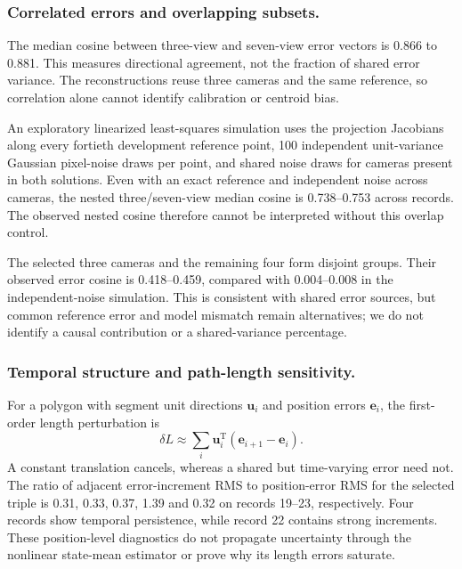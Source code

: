 \documentclass{iopjournal}
\begin{document}
\subsubsection{Correlated errors and overlapping subsets.}
The median cosine between three-view and seven-view error vectors is 0.866
to 0.881. This measures directional agreement, not the fraction of shared
error variance. The reconstructions reuse three cameras and the same
reference, so correlation alone cannot identify calibration or centroid bias.

An exploratory linearized least-squares simulation uses the projection
Jacobians along every fortieth development reference point, 100 independent
unit-variance Gaussian pixel-noise draws per point, and shared noise draws
for cameras present in both solutions. Even with an exact reference and
independent noise across cameras, the nested three/seven-view median cosine
is 0.738--0.753 across records. The observed nested cosine therefore cannot
be interpreted without this overlap control.

The selected three cameras and the remaining four form disjoint groups.
Their observed error cosine is 0.418--0.459, compared with 0.004--0.008 in
the independent-noise simulation. This is consistent with shared error
sources, but common reference error and model mismatch remain alternatives;
we do not identify a causal contribution or a shared-variance percentage.

\subsubsection{Temporal structure and path-length sensitivity.}
For a polygon with segment unit directions $\mathbf{u}_i$ and position
errors $\mathbf{e}_i$, the first-order length perturbation is
\begin{equation}
\delta L \approx \sum_i \mathbf{u}_i^{\mathrm T}
                         (\mathbf{e}_{i+1}-\mathbf{e}_i).
\label{eq:pathperturbation}
\end{equation}
A constant translation cancels, whereas a shared but time-varying error need
not. The ratio of adjacent error-increment RMS to position-error RMS for the
selected triple is 0.31, 0.33, 0.37, 1.39 and 0.32 on records 19--23,
respectively. Four records show temporal persistence, while record 22
contains strong increments. These position-level diagnostics do not propagate
uncertainty through the nonlinear state-mean estimator or prove why its
length errors saturate.
\end{document}
